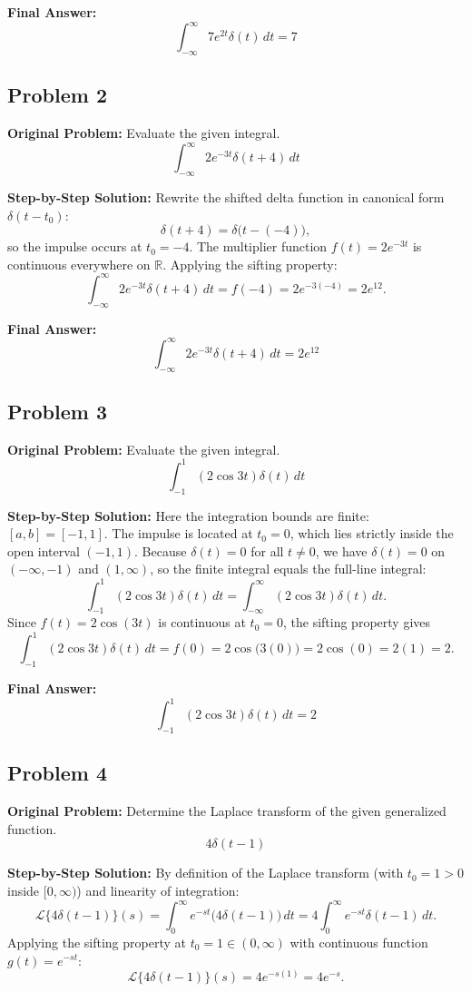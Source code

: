 \documentclass[11pt, letterpaper]{article}
\theoremstyle{definition}
\theoremstyle{remark}
\newcommand{\R}{\mathbb{R}}
\begin{document}
\textbf{Final Answer:}
\[
    \int_{-\infty}^{\infty} 7e^{2t}\delta(t)\,dt = 7
\]

\subsection{Problem 2}
\textbf{Original Problem:}
Evaluate the given integral.
\[
    \int_{-\infty}^{\infty} 2e^{-3t}\delta(t + 4)\,dt
\]

\textbf{Step-by-Step Solution:}
Rewrite the shifted delta function in canonical form $\delta(t - t_0)$:
\[
    \delta(t + 4) = \delta\bigl(t - (-4)\bigr),
\]
so the impulse occurs at $t_0 = -4$. The multiplier function $f(t) = 2e^{-3t}$ is continuous everywhere on $\R$. Applying the sifting property:
\[
    \int_{-\infty}^{\infty} 2e^{-3t}\delta(t + 4)\,dt = f(-4) = 2e^{-3(-4)} = 2e^{12}.
\]

\textbf{Final Answer:}
\[
    \int_{-\infty}^{\infty} 2e^{-3t}\delta(t + 4)\,dt = 2e^{12}
\]

\subsection{Problem 3}
\textbf{Original Problem:}
Evaluate the given integral.
\[
    \int_{-1}^{1} (2\cos 3t)\delta(t)\,dt
\]

\textbf{Step-by-Step Solution:}
Here the integration bounds are finite: $[a, b] = [-1, 1]$. The impulse is located at $t_0 = 0$, which lies strictly inside the open interval $(-1, 1)$. Because $\delta(t) = 0$ for all $t \neq 0$, we have $\delta(t) = 0$ on $(-\infty, -1)$ and $(1, \infty)$, so the finite integral equals the full-line integral:
\[
    \int_{-1}^{1} (2\cos 3t)\delta(t)\,dt = \int_{-\infty}^{\infty} (2\cos 3t)\delta(t)\,dt.
\]
Since $f(t) = 2\cos(3t)$ is continuous at $t_0 = 0$, the sifting property gives
\[
    \int_{-1}^{1} (2\cos 3t)\delta(t)\,dt = f(0) = 2\cos\bigl(3(0)\bigr) = 2\cos(0) = 2(1) = 2.
\]

\textbf{Final Answer:}
\[
    \int_{-1}^{1} (2\cos 3t)\delta(t)\,dt = 2
\]

\subsection{Problem 4}
\textbf{Original Problem:}
Determine the Laplace transform of the given generalized function.
\[
    4\delta(t - 1)
\]

\textbf{Step-by-Step Solution:}
By definition of the Laplace transform (with $t_0 = 1 > 0$ inside $[0, \infty)$) and linearity of integration:
\[
    \mathcal{L}\{4\delta(t - 1)\}(s) = \int_{0}^{\infty} e^{-st}\bigl(4\delta(t - 1)\bigr)\,dt = 4\int_{0}^{\infty} e^{-st}\delta(t - 1)\,dt.
\]
Applying the sifting property at $t_0 = 1 \in (0, \infty)$ with continuous function $g(t) = e^{-st}$:
\[
    \mathcal{L}\{4\delta(t - 1)\}(s) = 4 e^{-s(1)} = 4e^{-s}.
\]
\end{document}

